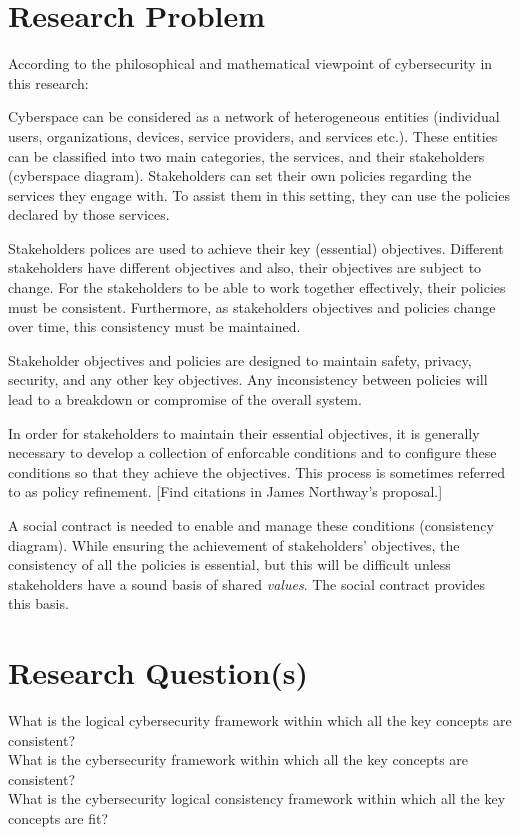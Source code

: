 \section{Research Problem}
According to the philosophical and mathematical viewpoint of cybersecurity in this research:

Cyberspace can be considered as a network of heterogeneous entities
(individual users, organizations, devices, service providers, and
services etc.). These entities can be classified into two main categories,
the services, and their stakeholders (cyberspace diagram).  Stakeholders
can set their own policies regarding the services they engage with. To
assist them in this setting, they can use the policies declared by
those services.

Stakeholders polices are used to achieve their key (essential)
objectives. Different stakeholders have different objectives and also,
their objectives are subject to change.  For the stakeholders to be
able to work together effectively, their policies must be consistent.
Furthermore, as stakeholders objectives and policies change over time,
this consistency must be maintained.

Stakeholder objectives and policies are designed to maintain safety, privacy, security,
and any other key objectives. Any inconsistency between policies will lead
to a breakdown or compromise of the overall system.

In order for stakeholders to maintain their essential objectives, it is
generally necessary to develop a collection of enforcable conditions and to configure these conditions so that they achieve the objectives. This process is sometimes referred to as policy refinement. [Find citations in James Northway's
proposal.]

A social contract is needed to enable and manage these conditions (consistency diagram).  While ensuring the achievement of stakeholders’ objectives, the consistency of all the policies is essential, but this will be difficult unless stakeholders have a sound basis of shared {\em values}. The social contract provides this basis.
\section{Research Question(s)}
\if
What is the logical cybersecurity framework within which all the key concepts are consistent?\\
What is the cybersecurity framework within which all the key concepts are consistent?\\
What is the cybersecurity logical consistency framework within which all the key concepts are fit?\\
\fi


